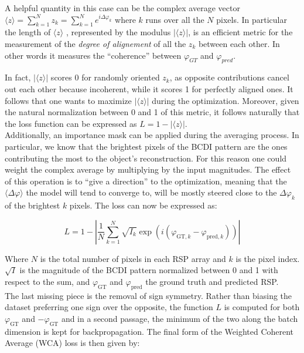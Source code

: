 A helpful quantity in this case can be the complex average vector $\langle z \rangle = \sum_{k=1}^{N}z_k = \sum_{k=1}^{N}e^{i\Delta\varphi_k}$
where $k$ runs over all the $N$ pixels. In particular the length of $\langle z \rangle$ , represented by the modulus $|\langle z \rangle|$,
is an efficient metric for the measurement of the \textit{degree of alignement} of all the $z_k$ between each other. 
In other words it measures the ``coherence'' between $\varphi_{GT}$ and $\varphi_{pred}$.

In fact, $|\langle z \rangle|$ scores 0 for randomly oriented $z_k$, as opposite contributions cancel out each other because 
incoherent, while it scores 1 for perfectly aligned ones. It follows that one wants to maximize $|\langle z \rangle|$ during the 
optimization. Moreover, given the natural normalization between 0 and 1 of this metric, it follows naturally that the loss 
function can be expressed as $ L =  1 - |\langle z \rangle| $. \\

Additionally, an importance mask can be applied during the averaging process. In particular, we know that the brightest 
pixels of the BCDI pattern are the ones contributing the most to the object's reconstruction. For this reason one could 
weight the complex average by multiplying by the input magnitudes. The effect of this operation is to ``give a direction'' to the 
optimization, meaning that the $\langle \Delta\varphi \rangle $ the model will tend to converge to, will be mostly steered close to 
the $\Delta\varphi_k$ of the brightest $k$ pixels. 
The loss can now be expressed as: 

\begin{equation}
    L = 1 - \left|\frac{1}{N}\sum_{k=1}^{N} \sqrt{I_{k}}\exp\left(i(\varphi_{\text{GT},k} - \varphi_{\text{pred},k})\right)\right|
\label{eq:WCA_1}
\end{equation}

Where $N$ is the total number of pixels in each RSP array and $k$ is the pixel index. $\sqrt{I}$ is the magnitude of the BCDI pattern 
normalized between 0 and 1 with respect to the sum, and $\varphi_{\text{GT}}$ and $ \varphi_{\text{pred}}$ the ground truth and 
predicted RSP. \\
The last missing piece is the removal of sign symmetry. Rather than biasing the dataset preferring one sign over the opposite, 
the function $L$ is computed for both $\varphi_{\text{GT}}$ and $-\varphi_{\text{GT}}$ and in a second passage, the minimum of the two 
along the batch dimension is kept for backpropagation. The final form of the Weighted Coherent Average (WCA) loss is then given 
by: 

